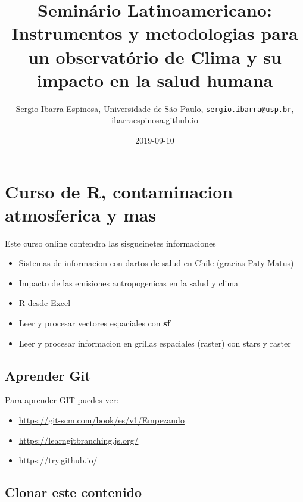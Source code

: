 \documentclass[]{book}
\title{Seminário Latinoamericano: Instrumentos y metodologias para un observatório de Clima y su impacto en la salud humana}
\author{Sergio Ibarra-Espinosa, Universidade de São Paulo, \href{mailto:sergio.ibarra@usp.br}{\nolinkurl{sergio.ibarra@usp.br}}, ibarraespinosa.github.io}
\date{2019-09-10}
\providecommand{\tightlist}{%
  \setlength{\itemsep}{0pt}\setlength{\parskip}{0pt}}
\begin{document}
\maketitle

{
\setcounter{tocdepth}{1}
\tableofcontents
}
\hypertarget{curso-de-r-contaminacion-atmosferica-y-mas}{%
\chapter*{Curso de R, contaminacion atmosferica y mas}\label{curso-de-r-contaminacion-atmosferica-y-mas}}

Este curso online contendra las sisgueinetes informaciones

\begin{itemize}
\tightlist
\item
  Sistemas de informacion con dartos de salud en Chile (gracias Paty Matus)
\item
  Impacto de las emisiones antropogenicas en la salud y clima
\item
  R desde Excel
\item
  Leer y procesar vectores espaciales con \textbf{sf} \citep{sf}
\item
  Leer y procesar informacion en grillas espaciales (raster) con stars\citep{stars} y raster\citep{raster}
\end{itemize}

\hypertarget{aprender-git}{%
\section*{Aprender Git}\label{aprender-git}}

Para aprender GIT puedes ver:

\begin{itemize}
\tightlist
\item
  \url{https://git-scm.com/book/es/v1/Empezando}
\item
  \url{https://learngitbranching.js.org/}
\item
  \url{https://try.github.io/}
\end{itemize}

\hypertarget{clonar-este-contenido}{%
\section*{Clonar este contenido}\label{clonar-este-contenido}}
\end{document}
